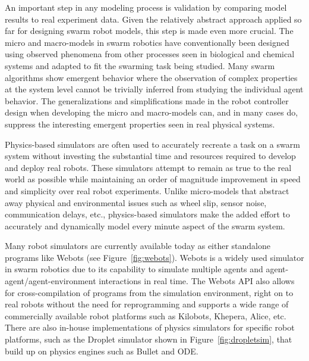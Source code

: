 \documentclass[12pt]{book}
\begin{document}
An important step in any modeling process is validation by comparing model results to real experiment data. Given the relatively abstract approach applied so far for designing swarm robot models, this step is made even more crucial. The micro and macro-models in swarm robotics have conventionally been designed using observed phenomena from other processes seen in biological and chemical systems and adapted to fit the swarming task being studied. Many swarm algorithms show emergent behavior where the observation of complex properties at the system level cannot be trivially inferred from studying the individual agent behavior. The generalizations and simplifications made in the robot controller design when developing the micro and macro-models can, and in many cases do, suppress the interesting emergent properties seen in real physical systems. 

Physics-based simulators are often used to accurately recreate a task on a swarm system without investing the substantial time and resources required to develop and deploy real robots. These simulators attempt to remain as true to the real world as possible while maintaining an order of magnitude improvement in speed and simplicity over real robot experiments. Unlike micro-models that abstract away physical and environmental issues such as wheel slip, sensor noise, communication delays, etc., physics-based simulators make the added effort to accurately and dynamically model every minute aspect of the swarm system.

Many robot simulators are currently available today as either standalone programs like Webots (see Figure~\ref{fig:webots}). Webots is a widely used simulator in swarm robotics due to its capability to simulate multiple agents and agent-agent/agent-environment interactions in real time. The Webots API also allows for cross-compilation of programs from the simulation environment, right on to real robots without the need for reprogramming and supports a wide range of commercially available robot platforms such as Kilobots, Khepera, Alice, etc. There are also in-house implementations of physics simulators for specific robot platforms, such as the Droplet simulator shown in Figure~\ref{fig:dropletsim}, that build up on physics engines such as Bullet and ODE.
\end{document}
